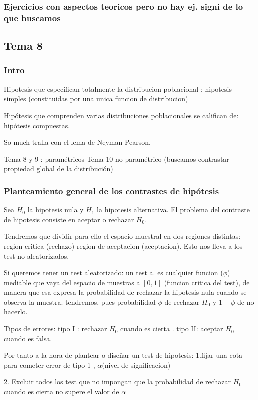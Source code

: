 \documentclass[a4paper,12pt]{article}
\begin{document}
\subsubsection{Ejercicios con aspectos teoricos pero no hay ej. signi de lo que buscamos}
\subsection{Tema 8}
\subsubsection{Intro}
Hipotesis que especifican totalmente la distribucion poblacional : hipotesis simples (constituidas por una unica funcion de distribucion)

Hipótesis  que comprenden varias distribuciones poblacionales se califican de: hipótesis compuestas.

So much tralla con el lema de Neyman-Pearson.

Tema 8 y 9 : paramétricos
Tema 10 no paramétrico (buscamos contrastar propiedad global de la distribución)
\subsubsection{Planteamiento general de los contrastes de hipótesis}
Sea $H_0$ la hipotesis nula y $H_1$ la hipotesis alternativa. El problema del contraste de hipotesis consiste en aceptar o rechazar $H_0$.

Tendremos que dividir para ello el espacio muestral  en dos regiones distintas: region critica (rechazo) region de aceptacion (aceptacion).
Esto nos lleva a los test no aleatorizados.

Si queremos tener un test aleatorizado: un test a. es cualquier funcion ($\phi$) mediable que vaya del espacio de muestras a $[0,1]$ (funcion critica del test), de manera que esa expresa la probabilidad de rechazar la hipotesis nula cuando se observa la muestra.
tendremos, pues probabilidad $\phi$ de rechazar $H_0$ y $1-\phi$ de no hacerlo. 

Tipos de errores: tipo I : rechazar $H_0$ cuando es cierta . tipo II: aceptar $H_0$ cuando es falsa.

Por tanto a la hora de plantear o diseñar un test de hipotesis:
1.fijar una cota para cometer error de tipo 1 , $\alpha$(nivel de significacion)

2. Excluir todos los test que no impongan que la probabilidad de rechazar $H_0$ cuando es cierta no supere el valor de $\alpha$  
\end{document}
